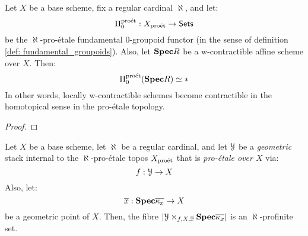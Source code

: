                 \begin{lemma} \label{lemma: pro_etale_locally_contractible}
                    Let $X$ be a base scheme, fix a regular cardinal $\aleph$, and let:
                        $$\Pi_0^{\mathrm{pro\acute{e}t}}: X_{\mathrm{pro\acute{e}t}} \to \mathsf{Sets}$$
                    be the $\aleph$-pro-\'etale fundamental $0$-groupoid functor (in the sense of definition \ref{def: fundamental_groupoids}). Also, let $\mathbf{Spec} R$ be a w-contractible affine scheme over $X$. Then:
                        $$\Pi_0^{\mathrm{pro\acute{e}t}}(\mathbf{Spec} R) \simeq *$$
                    In other words, locally w-contractible schemes become contractible in the homotopical sense in the pro-\'etale topology. 
                \end{lemma}
                    \begin{proof}
                        
                    \end{proof}
                \begin{corollary} \label{coro: pro_etale_fibres}
                    Let $X$ be a base scheme, let $\aleph$ be a regular cardinal, and let $\mathcal{Y}$ be a \textit{geometric} stack internal to the $\aleph$-pro-\'etale topos $X_{\mathrm{pro\acute{e}t}}$ that is \textit{pro-\'etale over $X$} via:
                        $$f: \mathcal{Y} \to X$$
                    Also, let:
                        $$\overline{x}: \mathbf{Spec} \overline{\kappa_x} \to X$$
                    be a geometric point of $X$. Then, the fibre $|\calY \x_{f, X, \overline{x}} \Spec \overline{\kappa_x}|$ is an $\aleph$-profinite set.
                \end{corollary}
                
